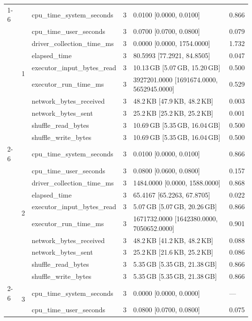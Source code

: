 \begin{tabular}{lllrll}
\cline{1-6} \cline{2-6}
\multirow[t]{30}{*}{national-scale-spatial-join-databricks-broadcast-8-nodes-medium} & \multirow[t]{10}{*}{1} & cpu_time_system_seconds & 3 & 0.0100 [0.0000, 0.0100] & 0.866 \\
 &  & cpu_time_user_seconds & 3 & 0.0700 [0.0700, 0.0800] & 0.079 \\
 &  & driver_collection_time_ms & 3 & 0.0000 [0.0000, 1754.0000] & 1.732 \\
 &  & elapsed_time & 3 & 80.5993 [77.2921, 84.8505] & 0.047 \\
 &  & executor_input_bytes_read & 3 & 10.13\,GB [5.07\,GB, 15.20\,GB] & 0.500 \\
 &  & executor_run_time_ms & 3 & 3927201.0000 [1691674.0000, 5652945.0000] & 0.529 \\
 &  & network_bytes_received & 3 & 48.2\,KB [47.9\,KB, 48.2\,KB] & 0.003 \\
 &  & network_bytes_sent & 3 & 25.2\,KB [25.2\,KB, 25.2\,KB] & 0.001 \\
 &  & shuffle_read_bytes & 3 & 10.69\,GB [5.35\,GB, 16.04\,GB] & 0.500 \\
 &  & shuffle_write_bytes & 3 & 10.69\,GB [5.35\,GB, 16.04\,GB] & 0.500 \\
\cline{2-6}
 & \multirow[t]{10}{*}{2} & cpu_time_system_seconds & 3 & 0.0100 [0.0000, 0.0100] & 0.866 \\
 &  & cpu_time_user_seconds & 3 & 0.0800 [0.0600, 0.0800] & 0.157 \\
 &  & driver_collection_time_ms & 3 & 1484.0000 [0.0000, 1588.0000] & 0.868 \\
 &  & elapsed_time & 3 & 65.4167 [65.2263, 67.8705] & 0.022 \\
 &  & executor_input_bytes_read & 3 & 5.07\,GB [5.07\,GB, 20.26\,GB] & 0.866 \\
 &  & executor_run_time_ms & 3 & 1671732.0000 [1642380.0000, 7050652.0000] & 0.901 \\
 &  & network_bytes_received & 3 & 48.2\,KB [41.2\,KB, 48.2\,KB] & 0.088 \\
 &  & network_bytes_sent & 3 & 25.2\,KB [21.6\,KB, 25.2\,KB] & 0.086 \\
 &  & shuffle_read_bytes & 3 & 5.35\,GB [5.35\,GB, 21.38\,GB] & 0.866 \\
 &  & shuffle_write_bytes & 3 & 5.35\,GB [5.35\,GB, 21.38\,GB] & 0.866 \\
\cline{2-6}
 & \multirow[t]{10}{*}{3} & cpu_time_system_seconds & 3 & 0.0000 [0.0000, 0.0000] & --- \\
 &  & cpu_time_user_seconds & 3 & 0.0800 [0.0700, 0.0800] & 0.075 \\

\end{tabular}
